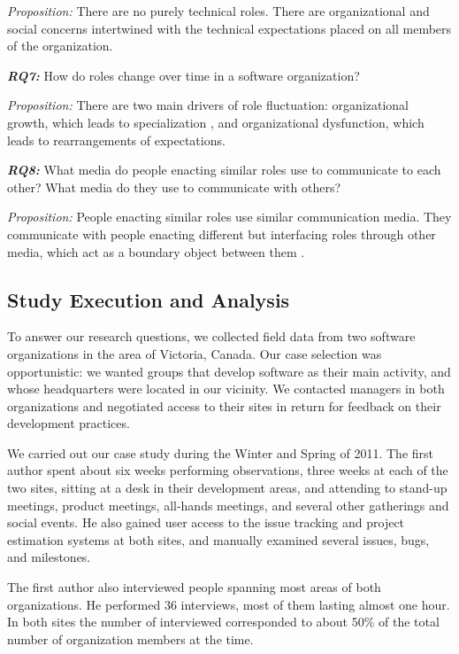 \documentclass[10pt, conference, compsocconf]{IEEEtran}
\begin{document}
\emph{Proposition:} There are no purely technical roles. There are organizational and social concerns intertwined with the technical expectations placed on all members of the organization.

\textbf{\emph{RQ7:}} How do roles change over time in a software organization?

\emph{Proposition:} There are two main drivers of role fluctuation: organizational growth, which leads to specialization \cite{Blau1971,Haveman1993}, and organizational dysfunction, which leads to rearrangements of expectations.

\textbf{\emph{RQ8:}} What media do people enacting similar roles use to communicate to each other? What media do they use to communicate with others?

\emph{Proposition:} People enacting similar roles use similar communication media. They communicate with people enacting different but interfacing roles through other media, which act as a boundary object between them \cite{Bowker1999}.



\subsection{Study Execution and Analysis}

To answer our research questions, we collected field data from two software organizations in the area of Victoria, Canada. Our case selection was opportunistic: we wanted groups that develop software as their main activity, and whose headquarters were located in our vicinity. We contacted managers in both organizations and negotiated access to their sites in return for feedback on their development practices.

We carried out our case study during the Winter and Spring of 2011. The first author spent about six weeks performing observations, three weeks at each of the two sites, sitting at a desk in their development areas, and attending to stand-up meetings, product meetings, all-hands meetings, and several other gatherings and social events. He also gained user access to the issue tracking and project estimation systems at both sites, and manually examined several issues, bugs, and milestones.

The first author also interviewed people spanning most areas of both organizations. He performed 36 interviews, most of them lasting almost one hour. In both sites the number of interviewed corresponded to about 50\% of the total number of organization members at the time.
\end{document}
